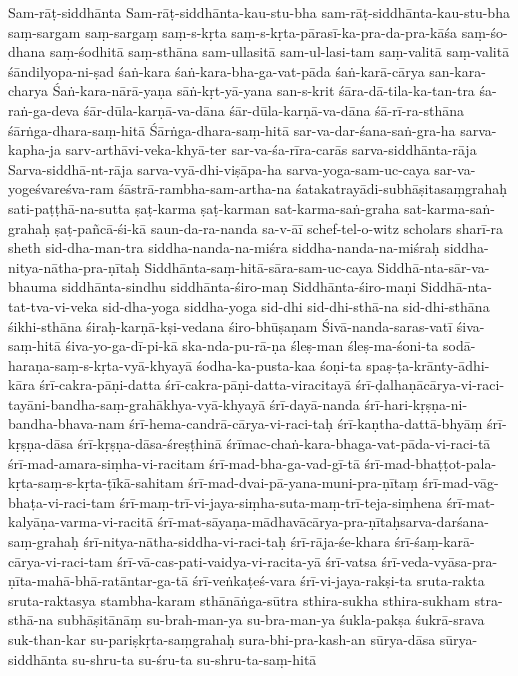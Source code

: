 {Sam-rāṭ-siddhānta
Sam-rāṭ-siddhānta-kau-stu-bha
sam-rāṭ-siddhānta-kau-stu-bha
saṃ-sargam
saṃ-sargaṃ
saṃ-s-kṛta
saṃ-s-kṛta-pārasī-ka-pra-da-pra-kāśa
saṃ-śo-dhana
saṃ-śodhitā
saṃ-sthāna
sam-ullasitā
sam-ul-lasi-tam
saṃ-valitā
saṃ-valitā
śāndilyopa-ni-ṣad
śaṅ-kara
śaṅ-kara-bha-ga-vat-pāda
śaṅ-karā-cārya
san-kara-charya
Śaṅ-kara-nārā-yaṇa
sāṅ-kṛt-yā-yana
san-s-krit
śāra-dā-tila-ka-tan-tra
śa-raṅ-ga-deva
śār-dūla-karṇā-va-dāna
śār-dūla-karṇā-va-dāna
śā-rī-ra-sthāna
śārṅga-dhara-saṃ-hitā
Śārṅga-dhara-saṃ-hitā
sar-va-dar-śana-saṅ-gra-ha
sarva-kapha-ja
sarv-arthāvi-veka-khyā-ter
sar-va-śa-rīra-carās
sarva-siddhānta-rāja
Sarva-siddhā-nt-rāja
sarva-vyā-dhi-viṣāpa-ha
sarva-yoga-sam-uc-caya
sar-va-yogeśvareśva-ram
śāstrā-rambha-sam-artha-na
śatakatrayādi-subhāṣitasaṃgrahaḥ
sati-paṭṭhā-na-sutta
ṣaṭ-karma
ṣaṭ-karman
sat-karma-saṅ-graha
sat-karma-saṅ-grahaḥ
ṣaṭ-pañcā-śi-kā
saun-da-ra-nanda
sa-v-āī
schef-tel-o-witz
scholars
sharī-ra
sheth
sid-dha-man-tra
siddha-nanda-na-miśra
siddha-nanda-na-miśraḥ
siddha-nitya-nātha-pra-ṇītaḥ
Siddhānta-saṃ-hitā-sāra-sam-uc-caya
Siddhā-nta-sār-va-bhauma
siddhānta-sindhu
siddhānta-śiro-maṇ
Siddhānta-śiro-maṇi
Siddhā-nta-tat-tva-vi-veka
sid-dha-yoga
siddha-yoga
sid-dhi
sid-dhi-sthā-na
sid-dhi-sthāna
śikhi-sthāna
śiraḥ-karṇā-kṣi-vedana
śiro-bhūṣaṇam
Śivā-nanda-saras-vatī
śiva-saṃ-hitā
śiva-yo-ga-dī-pi-kā
ska-nda-pu-rā-ṇa
śleṣ-man
śleṣ-ma-śoni-ta
sodā-haraṇa-saṃ-s-kṛta-vyā-khyayā
śodha-ka-pusta-kaa
śoṇi-ta
spaṣ-ṭa-krānty-ādhi-kāra
śrī-cakra-pāṇi-datta
śrī-cakra-pāṇi-datta-viracitayā
śrī-ḍalhaṇācārya-vi-raci-tayāni-bandha-saṃ-grahākhya-vyā-khyayā
śrī-dayā-nanda
śrī-hari-kṛṣṇa-ni-bandha-bhava-nam
śrī-hema-candrā-cārya-vi-raci-taḥ
śrī-kaṇtha-dattā-bhyāṃ
śrī-kṛṣṇa-dāsa
śrī-kṛṣṇa-dāsa-śreṣṭhinā
śrīmac-chaṅ-kara-bhaga-vat-pāda-vi-raci-tā
śrī-mad-amara-siṃha-vi-racitam
śrī-mad-bha-ga-vad-gī-tā
śrī-mad-bhaṭṭot-pala-kṛta-saṃ-s-kṛta-ṭīkā-sahitam
śrī-mad-dvai-pā-yana-muni-pra-ṇītaṃ
śrī-mad-vāg-bhaṭa-vi-raci-tam
śrī-maṃ-trī-vi-jaya-siṃha-suta-maṃ-trī-teja-siṃhena
śrī-mat-kalyāṇa-varma-vi-racitā
śrī-mat-sāyaṇa-mādhavācārya-pra-ṇītaḥsarva-darśana-saṃ-grahaḥ
śrī-nitya-nātha-siddha-vi-raci-taḥ
śrī-rāja-śe-khara
śrī-śaṃ-karā-cārya-vi-raci-tam
śrī-vā-cas-pati-vaidya-vi-racita-yā
śrī-vatsa
śrī-veda-vyāsa-pra-ṇīta-mahā-bhā-ratāntar-ga-tā
śrī-veṅkaṭeś-vara
śrī-vi-jaya-rakṣi-ta
sruta-rakta
sruta-raktasya
stambha-karam
sthānāṅga-sūtra
sthira-sukha
sthira-sukham
stra-sthā-na
subhāṣitānāṃ
su-brah-man-ya
su-bra-man-ya
śukla-pakṣa
śukrā-srava
suk-than-kar
su-pariṣkṛta-saṃgrahaḥ
sura-bhi-pra-kash-an
sūrya-dāsa
sūrya-siddhānta
su-shru-ta
su-śru-ta
su-shru-ta-saṃ-hitā
}
